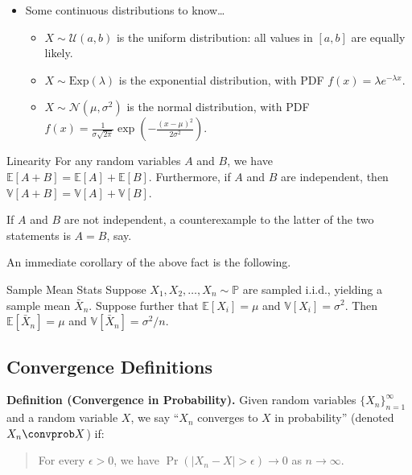 \begin{itemize}
\begin{itemize}
        \item $X \sim \text{Pois}(\lambda)$ is given by
        $\Pr(X = k) = \frac{\lambda^k e^{-\lambda}}{k!}$.
    \end{itemize}
    \item Some continuous distributions to know\dots
    \begin{itemize}
        \item $X \sim \mathcal{U}(a, b)$ is the uniform distribution:
        all values in $[a, b]$ are equally likely.
        \item $X \sim \text{Exp}(\lambda)$ is the exponential distribution, with PDF
        $f(x) = \lambda e^{- \lambda x}$.
        \item $X \sim \mathcal{N}(\mu, \sigma^2)$ is the normal distribution, with PDF
        $f(x) = \frac{1}{\sigma \sqrt{2\pi}} \exp\left(-\frac{(x - \mu)^2}{2\sigma^2}\right)$.
    \end{itemize}
\end{itemize}

\begin{theorem}{Linearity}
    For any random variables $A$ and $B$, we have
    $\mathbb{E}[A + B] = \mathbb{E}[A] + \mathbb{E}[B]$.
    Furthermore, if $A$ and $B$ are independent, then
    $\mathbb{V}[A + B] = \mathbb{V}[A] + \mathbb{V}[B]$.
\end{theorem}

\begin{remark}
    If $A$ and $B$ are not independent, a counterexample to the latter
    of the two statements is $A = B$, say.
\end{remark}

An immediate corollary of the above fact is the following.

\begin{theorem}{Sample Mean Stats}
    Suppose $X_1, X_2, \dots, X_n \sim \mathbb{P}$ are sampled i.i.d.,
    yielding a sample mean $\bar{X}_n$.  Suppose further
    that $\mathbb{E}[X_i] = \mu$ and $\mathbb{V}[X_i] = \sigma^2$.  Then
    $\mathbb{E}[\bar{X}_n] = \mu$ and
    $\mathbb{V}[\bar{X}_n] = \sigma^2 / n$.
\end{theorem}

\subsection{Convergence Definitions}

\textbf{Definition (Convergence in Probability).}
Given random variables $\{X_n\}_{n = 1}^{\infty}$
and a random variable $X$, we say ``$X_n$ converges to $X$ in probability''
(denoted $X_n \convprob X$) if:
\begin{quote}
    For every $\epsilon > 0$, we have $\Pr(|X_n - X| > \epsilon) \to 0$ as $n \to \infty$.
\end{quote}

